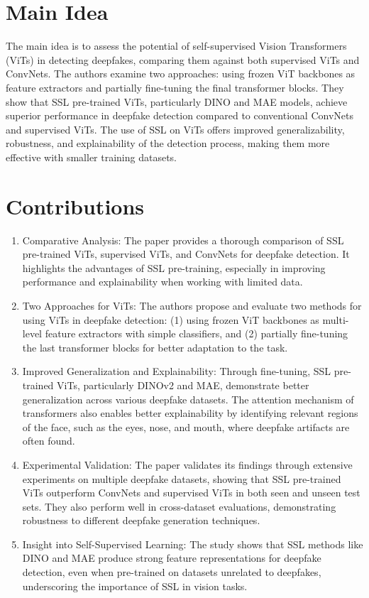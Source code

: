 \documentclass{report}
\begin{document}
	\section{Main Idea}
	The main idea is to assess the potential of self-supervised Vision Transformers (ViTs) in detecting deepfakes, comparing them against both supervised ViTs and ConvNets. The authors examine two approaches: using frozen ViT backbones as feature extractors and partially fine-tuning the final transformer blocks. They show that SSL pre-trained ViTs, particularly DINO and MAE models, achieve superior performance in deepfake detection compared to conventional ConvNets and supervised ViTs. The use of SSL on ViTs offers improved generalizability, robustness, and explainability of the detection process, making them more effective with smaller training datasets.
	
	\section{Contributions}
	\begin{enumerate}
		\item 
		Comparative Analysis: The paper provides a thorough comparison of SSL pre-trained ViTs, supervised ViTs, and ConvNets for deepfake detection. It highlights the advantages of SSL pre-training, especially in improving performance and explainability when working with limited data.
		
		\item 
		Two Approaches for ViTs: The authors propose and evaluate two methods for using ViTs in deepfake detection: (1) using frozen ViT backbones as multi-level feature extractors with simple classifiers, and (2) partially fine-tuning the last transformer blocks for better adaptation to the task.
		
		\item 
		Improved Generalization and Explainability: Through fine-tuning, SSL pre-trained ViTs, particularly DINOv2 and MAE, demonstrate better generalization across various deepfake datasets. The attention mechanism of transformers also enables better explainability by identifying relevant regions of the face, such as the eyes, nose, and mouth, where deepfake artifacts are often found.
		
		\item 
		Experimental Validation: The paper validates its findings through extensive experiments on multiple deepfake datasets, showing that SSL pre-trained ViTs outperform ConvNets and supervised ViTs in both seen and unseen test sets. They also perform well in cross-dataset evaluations, demonstrating robustness to different deepfake generation techniques.
		
		\item 
		Insight into Self-Supervised Learning: The study shows that SSL methods like DINO and MAE produce strong feature representations for deepfake detection, even when pre-trained on datasets unrelated to deepfakes, underscoring the importance of SSL in vision tasks.
	\end{enumerate}
	
\end{document}
